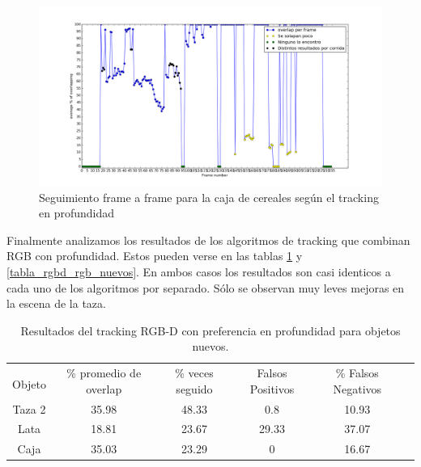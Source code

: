 \begin{figure}
	\centering
	\includegraphics[width=\textwidth]{img/frame_a_frame/depth-caja.png}
	\caption{Seguimiento frame a frame para la caja de cereales según el tracking en profundidad}
	\label{frame_frame_d_nuevo}
\end{figure}


Finalmente analizamos los resultados de los algoritmos de tracking que combinan RGB con profundidad. Estos pueden verse en las tablas \ref{tabla_rgbd_d_nuevos} y \ref{tabla_rgbd_rgb_nuevos}. En ambos casos los resultados son casi identicos a cada uno de los algoritmos por separado. Sólo se observan muy leves mejoras en la escena de la taza.

\begin{table}[h]
	\centering
    \begin{tabular}{|c|c|c|c|c|c|}
    \hline
    & \multirow{2}{2.4cm}{\% promedio de overlap} & \multirow{2}{2cm}{\% veces seguido} & \multirow{2}{1.6cm}{Falsos Positivos} & \multirow{2}{1.6cm}{\% Falsos Negativos}\\
	Objeto & & & &\\
    \hline
    Taza 2  & 35.98      & 48.33      & 0.8     & 10.93 \\
    \hline
    Lata    & 18.81      & 23.67      & 29.33   & 37.07 \\
    \hline
    Caja    & 35.03      & 23.29      & 0       & 16.67 \\
    \hline
    \end{tabular}
\caption{Resultados del tracking RGB-D con preferencia en profundidad para objetos nuevos.}
\label{tabla_rgbd_d_nuevos}
\end{table}

